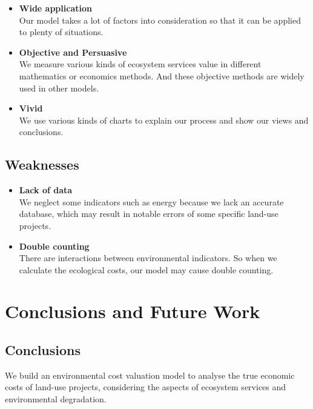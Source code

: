 \documentclass{mcmthesis}
\begin{document}
			\begin{itemize}
				
				\item \textbf{Wide application}\\Our model takes a lot of factors into consideration so that it can be applied to plenty of situations.
				
				\item \textbf{Objective and Persuasive}\\We measure various kinds of ecosystem services value in different mathematics or economics methods. And these objective methods are widely used in other models.
				
				\item \textbf{Vivid}\\We use various kinds of charts to explain our process and show our views and conclusions.

	
			\end{itemize}
		
		\subsection{Weaknesses}
		
			\begin{itemize}
				
				\item \textbf{Lack of data}\\
				We neglect some indicators such as energy because we lack an accurate database, which may result in notable errors of some specific land-use projects.
				
				\item \textbf{Double counting}\\
				There are interactions between environmental indicators. So when we calculate the ecological costs, our model may cause double counting.
		
			\end{itemize}
		
	\section{Conclusions and Future Work}
	
	
		\subsection{Conclusions}
	
			We build an environmental cost valuation model to analyse the true economic costs of land-use projects, considering the aspects of ecosystem services and environmental degradation. 
			
\end{document}
